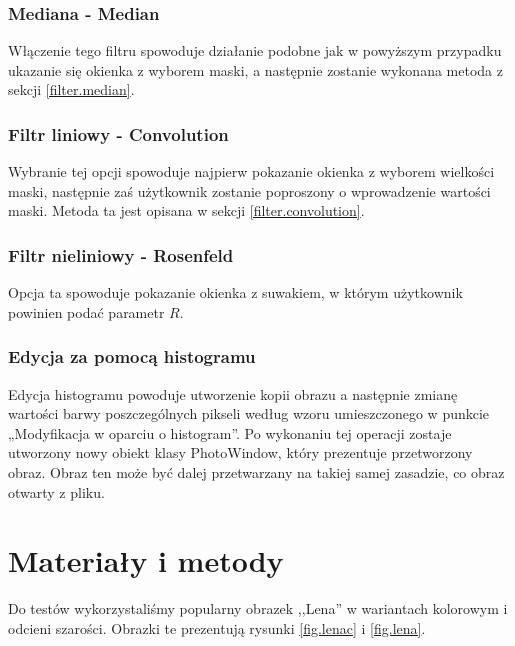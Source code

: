 \documentclass{classrep}
\begin{document}
\subsubsection{Mediana - Median}
Włączenie tego filtru spowoduje działanie podobne jak w powyższym przypadku \ppauza ukazanie się okienka z wyborem maski, a następnie zostanie wykonana metoda z sekcji \ref{filter.median}.

\subsubsection{Filtr liniowy - Convolution}
Wybranie tej opcji spowoduje najpierw pokazanie okienka z wyborem wielkości maski, następnie zaś użytkownik zostanie poproszony o wprowadzenie wartości maski. Metoda ta jest opisana w sekcji \ref{filter.convolution}.

\subsubsection{Filtr nieliniowy - Rosenfeld}
Opcja ta spowoduje pokazanie okienka z suwakiem, w którym użytkownik powinien podać parametr $R$.

\subsubsection{Edycja za pomocą histogramu}
Edycja histogramu powoduje utworzenie kopii obrazu a następnie zmianę wartości barwy poszczególnych pikseli według wzoru umieszczonego w punkcie „Modyfikacja w oparciu o histogram”. Po wykonaniu tej operacji zostaje utworzony nowy obiekt klasy PhotoWindow, który prezentuje przetworzony obraz. Obraz  ten może być dalej przetwarzany na takiej samej zasadzie, co obraz otwarty z pliku.

\clearpage

\section{Materiały i metody}
Do testów wykorzystaliśmy popularny obrazek ,,Lena'' w wariantach kolorowym i odcieni szarości. Obrazki te prezentują rysunki \ref{fig.lenac} i \ref{fig.lena}.
\end{document}

